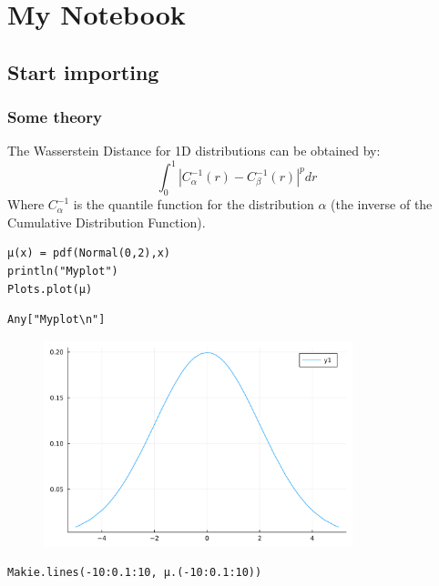 \newpage

\chapter{My Notebook}

\section{Start importing}

\subsection{Some theory}
The Wasserstein Distance for 1D distributions can be obtained by:  $$ \int_0^1 |C_\alpha^{-1}(r) - C_\beta^{-1}(r)|^p dr  $$  Where  $C_\alpha^{-1}$ is the quantile function for the distribution  $\alpha$ (the inverse of the Cumulative Distribution Function). 
\begin{lstlisting}[language=JuliaLocal, style=julia]
μ(x) = pdf(Normal(0,2),x)
println("Myplot")
Plots.plot(μ)
\end{lstlisting}

\begin{verbatim}
Any["Myplot\n"]
\end{verbatim}

\begin{figure}[H]
	\centering
	\includegraphics[width=0.8\textwidth]{./figures/jupyternotebook_figure1.svg}
	\label{fig:jupyternotebook_figure1.svg}

\end{figure}

\begin{lstlisting}[language=JuliaLocal, style=julia]
Makie.lines(-10:0.1:10, μ.(-10:0.1:10))
\end{lstlisting}

